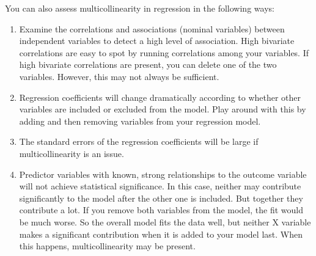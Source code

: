 \documentclass[a4paper,12pt]{article}
\begin{document}
You can also assess multicollinearity in regression in the following ways:
\begin{enumerate}
	\item  Examine the correlations and associations (nominal variables) between independent variables to detect a high level of association. High bivariate correlations are easy to spot by running correlations among your variables. If high bivariate correlations are present, you can delete one of the two variables. However, this may not always be sufficient.
	
\item  Regression coefficients will change dramatically according to whether other variables are included or excluded from the model. Play around with this by adding and then removing variables from your regression model.
	
\item  The standard errors of the regression coefficients will be large if multicollinearity is an issue.
	
\item Predictor variables with known, strong relationships to the outcome variable will not achieve statistical significance. In this case, neither may contribute significantly to the model after the other one is included. But together they contribute a lot. If you remove both variables from the model, the fit would be much worse. So the overall model fits the data well, but neither X variable makes a significant contribution when it is added to your model last. When this happens, multicollinearity may be present.
\end{enumerate}
\end{document}
